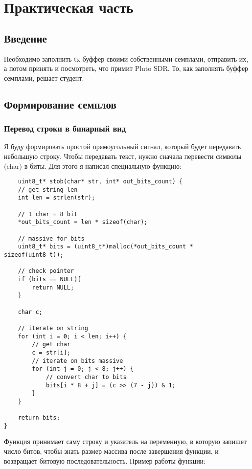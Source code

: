 \chapter{Практическая часть}
\label{ch:chap2}

\section*{\textbf{Введение}}

Необходимо заполнить tx буффер своими собственными семплами, отправить их, а потом принять и посмотреть, что примит Pluto SDR. То, как заполнять буффер семплами, решает
студент.

\section*{\textbf{Формирование семплов}}

\subsection*{\textbf{Перевод строки в бинарный вид}}

Я буду формировать простой прямоугольный сигнал, который будет передавать небольшую строку. Чтобы передавать текст, нужно сначала перевести символы (char) в биты.
Для этого я написал специальную функцию:

\begin{lstlisting}
    uint8_t* stob(char* str, int* out_bits_count) {
    // get string len
    int len = strlen(str);

    // 1 char = 8 bit 
    *out_bits_count = len * sizeof(char);
    
    // massive for bits
    uint8_t* bits = (uint8_t*)malloc(*out_bits_count * sizeof(uint8_t));

    // check pointer
    if (bits == NULL){
        return NULL;
    }
        
    char c;

    // iterate on string
    for (int i = 0; i < len; i++) {
        // get char 
        c = str[i];
        // iterate on bits massive
        for (int j = 0; j < 8; j++) {
            // convert char to bits 
            bits[i * 8 + j] = (c >> (7 - j)) & 1;
        }
    }
    
    return bits;
}
\end{lstlisting}

Функция принимает саму строку и указатель на переменную, в которую запишет число битов, чтобы знать размер массива после завершения функции, и возвращает битовую последовательность.
Пример работы функции: \\

